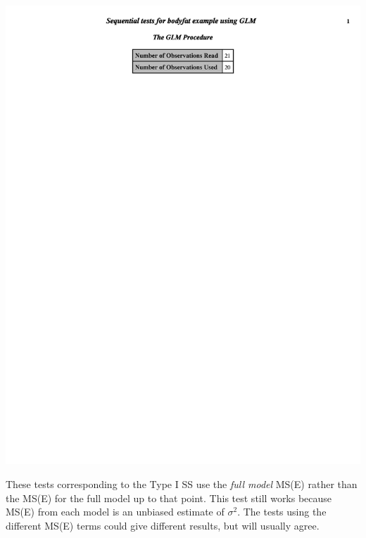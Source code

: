\begin{center}
\includegraphics[page=2,scale=0.7,trim= 10mm 60mm 10mm 10mm]{bodyfatexampletypeIglm}
\end{center}

These tests corresponding to the Type I SS use the \textit{full model} MS(E) rather than the MS(E) for the full model up to that point.  This test still works because MS(E) from each model is an unbiased estimate of $\sigma^2$.  The tests using the different MS(E) terms could give different results, but will usually agree.
\newpage

